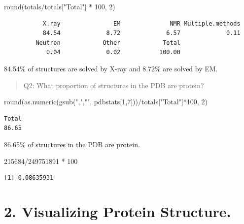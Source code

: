 \documentclass[
  letterpaper,
  DIV=11,
  numbers=noendperiod]{scrartcl}
\newenvironment{Shaded}{\begin{snugshade}}{\end{snugshade}}
\newcommand{\DecValTok}[1]{\textcolor[rgb]{0.68,0.00,0.00}{#1}}
\newcommand{\FunctionTok}[1]{\textcolor[rgb]{0.28,0.35,0.67}{#1}}
\newcommand{\NormalTok}[1]{\textcolor[rgb]{0.00,0.23,0.31}{#1}}
\newcommand{\SpecialCharTok}[1]{\textcolor[rgb]{0.37,0.37,0.37}{#1}}
\newcommand{\StringTok}[1]{\textcolor[rgb]{0.13,0.47,0.30}{#1}}
\begin{document}
\begin{Shaded}
\begin{Highlighting}[]
\FunctionTok{round}\NormalTok{(totals}\SpecialCharTok{/}\NormalTok{totals[}\StringTok{"Total"}\NormalTok{] }\SpecialCharTok{*} \DecValTok{100}\NormalTok{, }\DecValTok{2}\NormalTok{)}
\end{Highlighting}
\end{Shaded}

\begin{verbatim}
           X.ray               EM              NMR Multiple.methods 
           84.54             8.72             6.57             0.11 
         Neutron            Other            Total 
            0.04             0.02           100.00 
\end{verbatim}

84.54\% of structures are solved by X-ray and 8.72\% are solved by EM.

\begin{quote}
Q2: What proportion of structures in the PDB are protein?
\end{quote}

\begin{Shaded}
\begin{Highlighting}[]
\FunctionTok{round}\NormalTok{(}\FunctionTok{as.numeric}\NormalTok{(}\FunctionTok{gsub}\NormalTok{(}\StringTok{","}\NormalTok{,}\StringTok{""}\NormalTok{, pdbstats[}\DecValTok{1}\NormalTok{,}\DecValTok{7}\NormalTok{]))}\SpecialCharTok{/}\NormalTok{totals[}\StringTok{"Total"}\NormalTok{]}\SpecialCharTok{*}\DecValTok{100}\NormalTok{, }\DecValTok{2}\NormalTok{)}
\end{Highlighting}
\end{Shaded}

\begin{verbatim}
Total 
86.65 
\end{verbatim}

86.65\% of structures in the PDB are protein.

\begin{Shaded}
\begin{Highlighting}[]
\DecValTok{215684}\SpecialCharTok{/}\DecValTok{249751891} \SpecialCharTok{*} \DecValTok{100}
\end{Highlighting}
\end{Shaded}

\begin{verbatim}
[1] 0.08635931
\end{verbatim}

\hypertarget{visualizing-protein-structure.}{%
\section{2. Visualizing Protein
Structure.}\label{visualizing-protein-structure.}}
\end{document}
